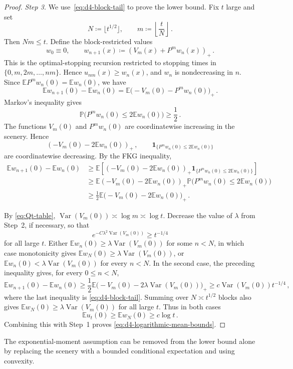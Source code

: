 \documentclass[11pt]{amsart}
\theoremstyle{plain}
\theoremstyle{definition}
\newcommand{\E}{\mathbb{E}}
\renewcommand{\P}{\mathbb{P}}
\DeclareMathOperator{\Var}{Var}
\begin{document}
\begin{proof}
			\emph{Step 3.}
			We use~\eqref{eq:d4-block-tail} to prove the lower bound. 
			Fix $t$ large and set
			\[
				N\coloneqq\lfloor t^{1/2}\rfloor,\qquad
				m\coloneqq\left\lfloor\frac{t}{N}\right\rfloor \, .
			\]
			Then $Nm\leq t$. Define the block-restricted values
			\[
				w_0\equiv0,\qquad
				w_{n+1}(x)\coloneqq\left(V_m(x)+P^mw_n(x)\right)_+ \, .
			\]
			This is the optimal-stopping recursion restricted to stopping times
			in $\{0,m,2m,\ldots,nm\}$. Hence $u_{nm}(x)\geq w_n(x)$, and
			$w_n$ is nondecreasing in $n$. Since
			$\E P^mw_n(0)=\E w_n(0)$, we have
			\[
				\E w_{n+1}(0)-\E w_n(0)
				=
				\E\bigl(-V_m(0)-P^mw_n(0)\bigr)_+ \, .
			\]
			Markov's inequality gives
			\[
				\P\bigl(P^mw_n(0)\leq2\E w_n(0)\bigr)\geq\frac12 \, .
			\]
			The functions $V_m(0)$ and $P^mw_n(0)$ are coordinatewise increasing
			in the scenery. Hence
			\[
				(-V_m(0)-2\E w_n(0))_+\, ,
				\qquad
				\mathbf 1_{\{P^mw_n(0)\leq2\E w_n(0)\}}
			\]
			are coordinatewise decreasing. By the FKG inequality,
			\[
			\begin{aligned}
				\E w_{n+1}(0)-\E w_n(0)
				&\geq
				\E\left[
				(-V_m(0)-2\E w_n(0))_+
				\mathbf 1_{\{P^mw_n(0)\leq2\E w_n(0)\}}
				\right]  \\
				&\geq
				\E(-V_m(0)-2\E w_n(0))_+
				\P\bigl(P^mw_n(0)\leq2\E w_n(0)\bigr)\\
				&\geq
				\frac12\E\bigl(-V_m(0)-2\E w_n(0)\bigr)_+ \, .
			\end{aligned}
			\]

			By \eqref{eq:Qt-table},
			$\Var(V_m(0))\asymp\log m\asymp\log t$. Decrease the value of
			$\lambda$ from Step~2, if necessary, so that
			\[
				e^{-C\lambda^2\Var(V_m(0))}\geq t^{-1/4}
			\]
			for all large $t$. Either $\E w_n(0)\geq\lambda\Var(V_m(0))$ for some
			$n<N$, in which case monotonicity gives
			$\E w_N(0)\geq\lambda\Var(V_m(0))$, or
			$\E w_n(0)<\lambda\Var(V_m(0))$ for every $n<N$. In the second case,
			the preceding inequality gives, for every $0\leq n<N$,
			\[
				\E w_{n+1}(0)-\E w_n(0)
				\geq \frac12\E\bigl(-V_m(0)-2\lambda\Var(V_m(0))\bigr)_+ \geq c\Var(V_m(0))t^{-1/4}\, ,
			\]
			where the last inequality is \eqref{eq:d4-block-tail}. Summing over
			$N\asymp t^{1/2}$ blocks also gives
			$\E w_N(0)\geq\lambda\Var(V_m(0))$ for all large $t$. Thus in both cases
			\[
				\E u_t(0)\geq \E w_N(0)\geq c\log t\, .
			\]
			Combining this with Step~1 proves
			\eqref{eq:d4-logarithmic-mean-bounds}.
		\end{proof}

The exponential-moment assumption can be removed from the lower bound alone
by replacing the scenery with a bounded conditional expectation and using
convexity.
\end{document}
